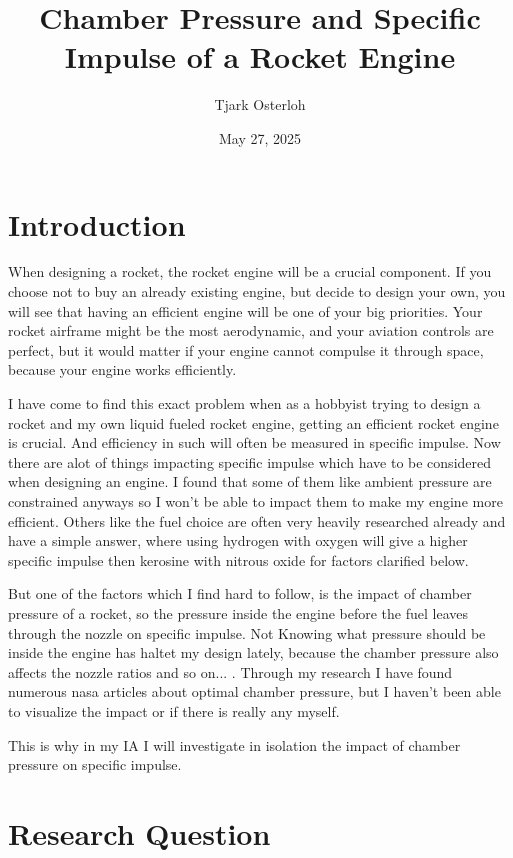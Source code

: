 \documentclass[12pt,a4paper]{article}
\title{\textbf{Chamber Pressure and Specific Impulse of a Rocket Engine}}
\author{Tjark Osterloh}
\date{May 27, 2025}
\begin{document}
\maketitle

\section{Introduction}

When designing a rocket, the rocket engine will be a crucial component. If you choose not to buy an already existing engine, but decide to design your own, you will see that having an efficient engine will be one of your big priorities. Your rocket airframe might be the most aerodynamic, and your aviation controls are perfect, but it would matter if your engine cannot compulse it through space, because your engine works efficiently.

I have come to find this exact problem when as a hobbyist trying to design a rocket and my own liquid fueled rocket engine, getting an efficient rocket engine is crucial. And efficiency in such will often be measured in specific impulse. Now there are alot of things impacting specific impulse which have to be considered when designing an engine. I found that some of them like ambient pressure are constrained anyways so I won't be able to impact them to make my engine more efficient. Others like the fuel choice are often very heavily researched already and have a simple answer, where using hydrogen with oxygen will give a higher specific impulse then kerosine with nitrous oxide for factors clarified below.

But one of the factors which I find hard to follow, is the impact of chamber pressure of a rocket, so the pressure inside the engine before the fuel leaves through the nozzle on specific impulse. Not Knowing what pressure should be inside the engine has haltet my design lately, because the chamber pressure also affects the nozzle ratios and so on... . Through my research I have found numerous nasa articles about optimal chamber pressure, but I haven't been able to visualize the impact or if there is really any myself.

This is why in my IA I will investigate in isolation the impact of chamber pressure on specific impulse.

\section{Research Question}
\end{document}
